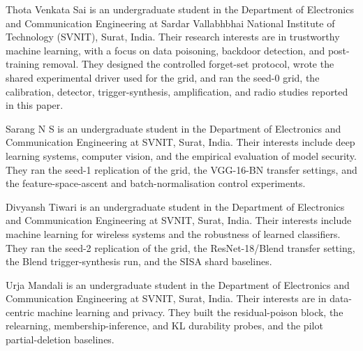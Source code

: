 \begin{IEEEbiographynophoto}{Thota Venkata Sai}
is an undergraduate student in the Department of Electronics and Communication
Engineering at Sardar Vallabhbhai National Institute of Technology (SVNIT),
Surat, India. Their research interests are in trustworthy machine learning, with
a focus on data poisoning, backdoor detection, and post-training removal. They
designed the controlled forget-set protocol, wrote the shared experimental driver
used for the grid, and ran the seed-0 grid, the calibration, detector,
trigger-synthesis, amplification, and radio studies reported in this paper.
\end{IEEEbiographynophoto}

\begin{IEEEbiographynophoto}{Sarang N S}
is an undergraduate student in the Department of Electronics and Communication
Engineering at SVNIT, Surat, India. Their interests include deep learning
systems, computer vision, and the empirical evaluation of model security. They
ran the seed-1 replication of the grid, the VGG-16-BN transfer settings, and the
feature-space-ascent and batch-normalisation control experiments.
\end{IEEEbiographynophoto}

\begin{IEEEbiographynophoto}{Divyansh Tiwari}
is an undergraduate student in the Department of Electronics and Communication
Engineering at SVNIT, Surat, India. Their interests include machine learning for
wireless systems and the robustness of learned classifiers. They ran the seed-2
replication of the grid, the ResNet-18/Blend transfer setting, the Blend
trigger-synthesis run, and the SISA shard baselines.
\end{IEEEbiographynophoto}

\begin{IEEEbiographynophoto}{Urja Mandali}
is an undergraduate student in the Department of Electronics and Communication
Engineering at SVNIT, Surat, India. Their interests are in data-centric machine
learning and privacy. They built the residual-poison block, the relearning,
membership-inference, and KL durability probes, and the pilot partial-deletion
baselines.
\end{IEEEbiographynophoto}
